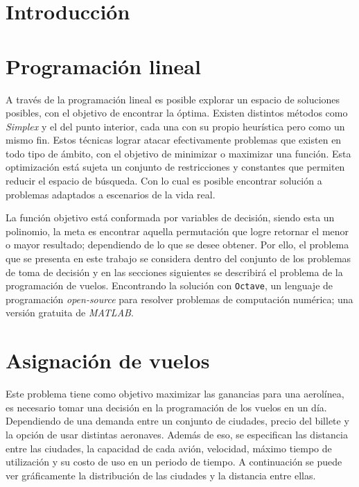 \documentclass[12pt]{article}
\begin{document}
\section{Introducción}

\lipsum[1-2]

\newpage

\section{Programación lineal}

A través de la programación lineal es posible explorar un espacio de soluciones posibles, con el objetivo de encontrar la óptima. Existen distintos métodos como \emph{Simplex} y el del punto interior, cada una con su propio heurística pero como un mismo fin. Estos técnicas lograr atacar efectivamente problemas que existen en todo tipo de ámbito, con el objetivo de minimizar o maximizar una función. Esta optimización está sujeta un conjunto de restricciones y constantes que permiten reducir el espacio de búsqueda. Con lo cual es posible encontrar solución a problemas adaptados a escenarios de la vida real.

La función objetivo está conformada por variables de decisión, siendo esta un polinomio, la meta es encontrar aquella permutación que logre retornar el menor o mayor resultado; dependiendo de lo que se desee obtener. Por ello, el problema que se presenta en este trabajo se considera dentro del conjunto de los problemas de toma de decisión y en las secciones siguientes se describirá el problema de la programación de vuelos. Encontrando la solución con \texttt{Octave}, un lenguaje de programación \emph{open-source} para resolver problemas de computación numérica; una versión gratuita de \emph{MATLAB}.

\section{Asignación de vuelos}

Este problema tiene como objetivo maximizar las ganancias para una aerolínea, es necesario tomar una decisión en la programación de los vuelos en un día. Dependiendo de una demanda entre un conjunto de ciudades, precio del billete y la opción de usar distintas aeronaves. Además de eso, se especifican las distancia entre las ciudades, la capacidad de cada avión, velocidad, máximo tiempo de utilización y su costo de uso en un periodo de tiempo. A continuación se puede ver gráficamente la distribución de las ciudades y la distancia entre ellas.
\end{document}
